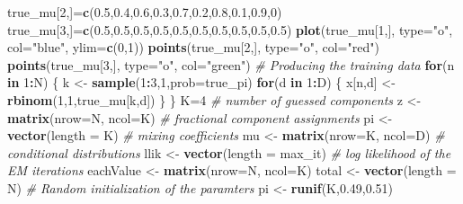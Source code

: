 \documentclass[]{article}
\newenvironment{Shaded}{\begin{snugshade}}{\end{snugshade}}
\newcommand{\KeywordTok}[1]{\textcolor[rgb]{0.13,0.29,0.53}{\textbf{#1}}}
\newcommand{\DataTypeTok}[1]{\textcolor[rgb]{0.13,0.29,0.53}{#1}}
\newcommand{\DecValTok}[1]{\textcolor[rgb]{0.00,0.00,0.81}{#1}}
\newcommand{\FloatTok}[1]{\textcolor[rgb]{0.00,0.00,0.81}{#1}}
\newcommand{\StringTok}[1]{\textcolor[rgb]{0.31,0.60,0.02}{#1}}
\newcommand{\CommentTok}[1]{\textcolor[rgb]{0.56,0.35,0.01}{\textit{#1}}}
\newcommand{\ControlFlowTok}[1]{\textcolor[rgb]{0.13,0.29,0.53}{\textbf{#1}}}
\newcommand{\OperatorTok}[1]{\textcolor[rgb]{0.81,0.36,0.00}{\textbf{#1}}}
\newcommand{\NormalTok}[1]{#1}
\begin{document}
\begin{Shaded}
\begin{Highlighting}[]
{{\NormalTok{true_mu[}\DecValTok{2}\NormalTok{,]=}\KeywordTok{c}\NormalTok{(}\FloatTok{0.5}\NormalTok{,}\FloatTok{0.4}\NormalTok{,}\FloatTok{0.6}\NormalTok{,}\FloatTok{0.3}\NormalTok{,}\FloatTok{0.7}\NormalTok{,}\FloatTok{0.2}\NormalTok{,}\FloatTok{0.8}\NormalTok{,}\FloatTok{0.1}\NormalTok{,}\FloatTok{0.9}\NormalTok{,}\DecValTok{0}\NormalTok{)}
\NormalTok{true_mu[}\DecValTok{3}\NormalTok{,]=}\KeywordTok{c}\NormalTok{(}\FloatTok{0.5}\NormalTok{,}\FloatTok{0.5}\NormalTok{,}\FloatTok{0.5}\NormalTok{,}\FloatTok{0.5}\NormalTok{,}\FloatTok{0.5}\NormalTok{,}\FloatTok{0.5}\NormalTok{,}\FloatTok{0.5}\NormalTok{,}\FloatTok{0.5}\NormalTok{,}\FloatTok{0.5}\NormalTok{,}\FloatTok{0.5}\NormalTok{)}
\KeywordTok{plot}\NormalTok{(true_mu[}\DecValTok{1}\NormalTok{,], }\DataTypeTok{type=}\StringTok{"o"}\NormalTok{, }\DataTypeTok{col=}\StringTok{"blue"}\NormalTok{, }\DataTypeTok{ylim=}\KeywordTok{c}\NormalTok{(}\DecValTok{0}\NormalTok{,}\DecValTok{1}\NormalTok{))}
\KeywordTok{points}\NormalTok{(true_mu[}\DecValTok{2}\NormalTok{,], }\DataTypeTok{type=}\StringTok{"o"}\NormalTok{, }\DataTypeTok{col=}\StringTok{"red"}\NormalTok{)}
\KeywordTok{points}\NormalTok{(true_mu[}\DecValTok{3}\NormalTok{,], }\DataTypeTok{type=}\StringTok{"o"}\NormalTok{, }\DataTypeTok{col=}\StringTok{"green"}\NormalTok{)}
\CommentTok{# Producing the training data}
\ControlFlowTok{for}\NormalTok{(n }\ControlFlowTok{in} \DecValTok{1}\OperatorTok{:}\NormalTok{N) \{}
\NormalTok{k <-}\StringTok{ }\KeywordTok{sample}\NormalTok{(}\DecValTok{1}\OperatorTok{:}\DecValTok{3}\NormalTok{,}\DecValTok{1}\NormalTok{,}\DataTypeTok{prob=}\NormalTok{true_pi)}
\ControlFlowTok{for}\NormalTok{(d }\ControlFlowTok{in} \DecValTok{1}\OperatorTok{:}\NormalTok{D) \{}
\NormalTok{x[n,d] <-}\StringTok{ }\KeywordTok{rbinom}\NormalTok{(}\DecValTok{1}\NormalTok{,}\DecValTok{1}\NormalTok{,true_mu[k,d])}
\NormalTok{\}}
\NormalTok{\}}
\NormalTok{K=}\DecValTok{4} \CommentTok{# number of guessed components}
\NormalTok{z <-}\StringTok{ }\KeywordTok{matrix}\NormalTok{(}\DataTypeTok{nrow=}\NormalTok{N, }\DataTypeTok{ncol=}\NormalTok{K) }\CommentTok{# fractional component assignments}
\NormalTok{pi <-}\StringTok{ }\KeywordTok{vector}\NormalTok{(}\DataTypeTok{length =}\NormalTok{ K) }\CommentTok{# mixing coefficients}
\NormalTok{mu <-}\StringTok{ }\KeywordTok{matrix}\NormalTok{(}\DataTypeTok{nrow=}\NormalTok{K, }\DataTypeTok{ncol=}\NormalTok{D) }\CommentTok{# conditional distributions}
\NormalTok{llik <-}\StringTok{ }\KeywordTok{vector}\NormalTok{(}\DataTypeTok{length =}\NormalTok{ max_it) }\CommentTok{# log likelihood of the EM iterations}
\NormalTok{eachValue <-}\StringTok{ }\KeywordTok{matrix}\NormalTok{(}\DataTypeTok{nrow=}\NormalTok{N, }\DataTypeTok{ncol=}\NormalTok{K)}
\NormalTok{total <-}\StringTok{ }\KeywordTok{vector}\NormalTok{(}\DataTypeTok{length =}\NormalTok{ N)}
\CommentTok{# Random initialization of the paramters}
\NormalTok{pi <-}\StringTok{ }\KeywordTok{runif}\NormalTok{(K,}\FloatTok{0.49}\NormalTok{,}\FloatTok{0.51}\NormalTok{)}

}}
\end{Highlighting}
\end{Shaded}
\end{document}
